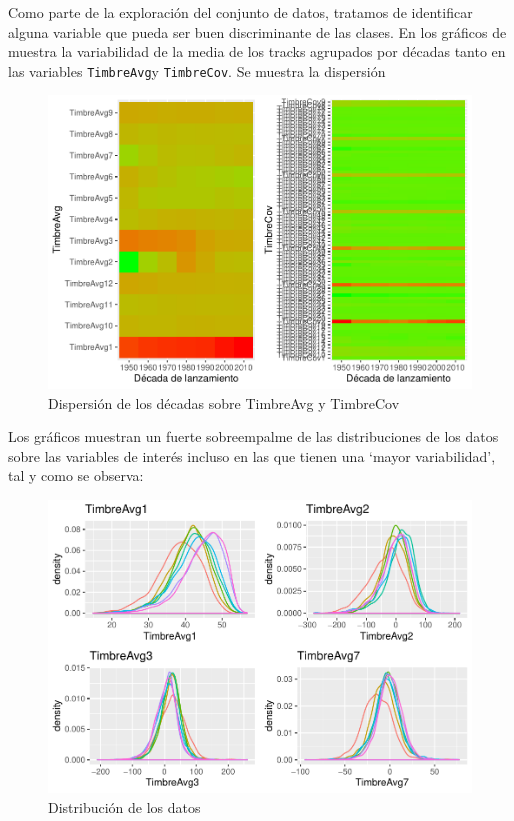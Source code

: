 \documentclass[conference,final,]{IEEEtran}
\begin{document}
Como parte de la exploración del conjunto de datos, tratamos de
identificar alguna variable que pueda ser buen discriminante de las
clases. En los gráficos de muestra la variabilidad de la media de los
tracks agrupados por décadas tanto en las variables \texttt{TimbreAvg}y
\texttt{TimbreCov}. Se muestra la dispersión

\begin{figure}[H]

{\centering \includegraphics[width=0.6\linewidth]{YearPrediction_Reporte_files/figure-latex/unnamed-chunk-13-1} 

}

\caption{Dispersión de los décadas sobre TimbreAvg y TimbreCov }\label{fig:unnamed-chunk-13}
\end{figure}

Los gráficos muestran un fuerte sobreempalme de las distribuciones de
los datos sobre las variables de interés incluso en las que tienen una
`mayor variabilidad', tal y como se observa:

\begin{figure}[H]

{\centering \includegraphics[width=0.6\linewidth]{YearPrediction_Reporte_files/figure-latex/unnamed-chunk-14-1} 

}

\caption{Distribución de los datos}\label{fig:unnamed-chunk-14}
\end{figure}
\end{document}
